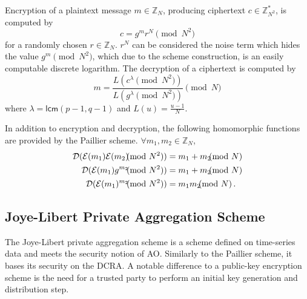 \documentclass[twocolumn]{autart}
\theoremstyle{definition}
\theoremstyle{remark}
\begin{document}
Encryption of a plaintext message $m \in \mathbb{Z}_N$, producing ciphertext $c \in \mathbb{Z}^{*}_{N^2}$, is computed by
\begin{equation}
    c = g^m r^N \pmod{N^2}
\end{equation}
for a randomly chosen $r \in \mathbb{Z}_{N}$. $r^N$ can be considered the noise term which hides the value $g^m \pmod{N^2}$, which due to the scheme construction, is an easily computable discrete logarithm. The decryption of a ciphertext is computed by
\begin{equation}
    m = \frac{L(c^\lambda\pmod{N^2})}{L(g^\lambda\pmod{N^2})} \pmod{N}
\end{equation}
where $\lambda = \mathsf{lcm}(p-1, q-1)$ and $L(u) = \frac{u-1}{N}$.

In addition to encryption and decryption, the following homomorphic functions are provided by the Paillier scheme. $\forall m_1,m_2 \in \mathbb{Z}_N$,
\begin{align}
    \mathcal{D}(\mathcal{E}(m_1)\mathcal{E}(m_2) \hspace{-7pt} \pmod{N^2}) &= m_1+m_2 \hspace{-7pt} \pmod{N} \\
    \mathcal{D}(\mathcal{E}(m_1)g^{m_2} \hspace{-7pt} \pmod{N^2}) &= m_1+m_2\hspace{-7pt}\pmod{N} \\
    \mathcal{D}(\mathcal{E}(m_1)^{m_2} \hspace{-7pt} \pmod{N^2}) &= m_1m_2 \hspace{-7pt} \pmod{N}\,. \label{eqn:paillier_hom_mult}
\end{align}

% 
% 

\subsection{Joye-Libert Private Aggregation Scheme} \label{subsec:joye_libert_scheme}
The Joye-Libert private aggregation scheme \cite{joyeScalableSchemePrivacyPreserving2013} is a scheme defined on time-series data and meets the security notion of AO. Similarly to the Paillier scheme, it bases its security on the DCRA. A notable difference to a public-key encryption scheme is the need for a trusted party to perform an initial key generation and distribution step.
\end{document}
